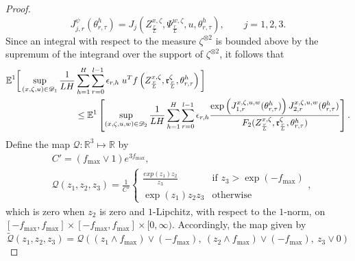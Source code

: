 \documentclass{article}
\newcommand{\R}{\mathbb{R}}
\begin{document}
\begin{appendices}
\begin{proof}
\begin{equation}\label{eqn:shorthand}
            J^{\psi}_{j,r}(\theta^h_{r,\tau}) =J_j(Z^{x,\zeta}_\frac{r}{L},\Psi^{w,\zeta}_\frac{r}{L},u,\theta^h_{r,\tau}), \qquad j=1,2,3.
\end{equation}
     Since an integral with respect to the measure $\zeta^{\otimes 2}$ is bounded above by the supremum of the integrand over the support of $\zeta^{\otimes 2}$, it follows that
    \begin{align}\label{eqn:EnormK}
\mathbb E^1\bigg[ \sup_{(x,\zeta,u)\in \mathscr D_1}\frac{1}{LH}&\sum_{h=1}^H\sum_{r=0}^{l-1}\epsilon_{r,h}\;u^Tf\left(Z^{x,\zeta}_\frac{r}{L},\mathfrak{r}^{\zeta}_\frac{r}{L},\theta_{r,\tau}^h\right)\bigg]
\\&\le \mathbb E^1\left[ \sup_{(x,\zeta,u,w)\in \mathscr D_2}\frac{1}{LH}\sum_{h=1}^{H}\sum_{r=0}^{l-1}\epsilon_{r,h}\frac{ \exp\left(J^{x,\zeta,u,w}_{1,r}(\theta^h_{r,\tau})\right)J^{x,\zeta,u,w}_{2,r}(\theta^h_{r,\tau})}{F_2(Z^{x,\zeta}_\frac{r}{L},\mathfrak{r}^{\zeta}_\frac{r}{L},\theta^h_{r,\tau})}\right].\notag
\end{align}
 Define the map $\mathcal{Q}:\R^3\mapsto \R$ by
\begin{align*}
&C'=\left(f_{\mathrm{max}}\vee 1 \right)e^{3f_\mathrm{max}},\\ &\mathcal{Q}(z_1,z_2,z_3)= \frac{1}{C'}\begin{cases}
    \frac{ exp(z_1)z_2}{z_3} &\text{if } z_3>\exp(-f_\mathrm{max})\\
    \exp(z_1) z_2z_3 &\text{otherwise}
\end{cases},
\end{align*}
which is zero when $z_2$ is zero and $1$-Lipchitz, with respect to the $1$-norm, on $[-f_\mathrm{max},f_\mathrm{max}]\times[-f_\mathrm{max},f_\mathrm{max}]\times[0,\infty)$. Accordingly, the map given by 
\[
\widetilde{\mathcal Q}(z_1,z_2,z_3) =\mathcal Q\left((z_1\wedge f_\mathrm{max})\vee(-f_\mathrm{max}),\ (z_2\wedge f_\mathrm{max})\vee(-f_\mathrm{max}), \ z_3\vee 0\right)
\]

\end{proof}
\end{appendices}
\end{document}
